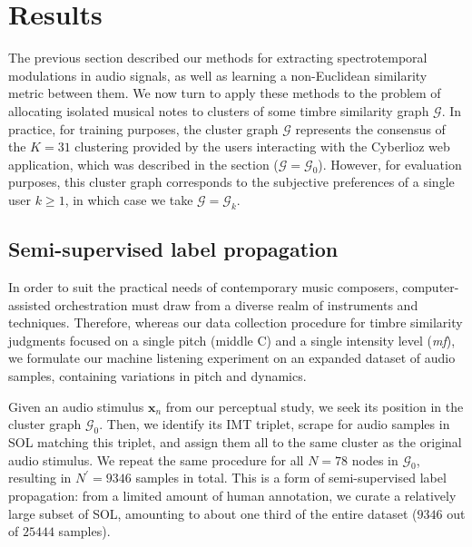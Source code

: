 \documentclass{bmcart}
\newcommand{\lnameref}[1]{%
\bgroup
\let\nmu\MakeLowercase
\nameref{#1}\egroup}
\newcommand{\nmu}{}
\begin{document}



\section*{\nmu Results}
\label{sec:results}

The previous section described our methods for extracting spectrotemporal modulations in audio signals, as well as learning a non-Euclidean similarity metric between them.
We now turn to apply these methods to the problem of allocating isolated musical notes to clusters of some timbre similarity graph $\mathcal{G}$.
In practice, for training purposes, the cluster graph $\mathcal{G}$ represents the consensus of the $K=31$ clustering provided by the users interacting with the Cyberlioz web application, which was described in the \lnameref{sec:data-collection} section ($\mathcal{G}=\mathcal{G}_0$).
However, for evaluation purposes, this cluster graph corresponds to the subjective preferences of a single user $k\geq 1$, in which case we take $\mathcal{G}=\mathcal{G}_k$.


\subsection*{Semi-supervised label propagation}

In order to suit the practical needs of contemporary music composers, computer-assisted orchestration must draw from a diverse realm of instruments and techniques.
Therefore, whereas our data collection procedure for timbre similarity judgments focused on a single pitch (middle C) and a single intensity level (\emph{mf}), we formulate our machine listening experiment on an expanded dataset of audio samples, containing variations in pitch and dynamics.



Given an audio stimulus $\boldsymbol{x}_n$ from our perceptual study, we seek its position in the cluster graph $\mathcal{G}_0$.
Then, we identify its IMT triplet, scrape for audio samples in SOL matching this triplet, and assign them all to the same cluster as the original audio stimulus.
We repeat the same procedure for all $N=78$ nodes in $\mathcal{G}_0$, resulting in $N^\prime = 9346$ samples in total.
This is a form of semi-supervised label propagation: from a limited amount of human annotation, we curate a relatively large subset of SOL, amounting to about one third of the entire dataset ($9346$ out of $25444$ samples).
\end{document}
